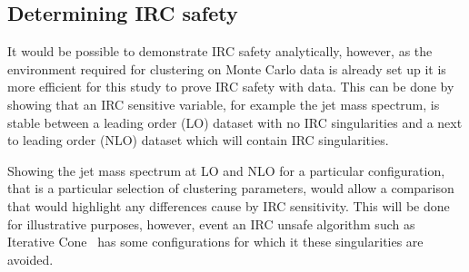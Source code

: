 
\subsection{Determining IRC safety}\label{sec:IRCmethod}
    It would be possible to demonstrate IRC safety analytically, however,
    as the environment required for clustering on Monte Carlo data is already set up
    it is more efficient for this study to prove IRC safety with data.
    This can be done by showing that an IRC sensitive variable, for example the jet mass spectrum,
    is stable between a leading order (LO) dataset with no IRC singularities and a next to leading order (NLO)
    dataset which will contain IRC singularities.

    Showing the jet mass spectrum at LO and NLO for a particular configuration,
    that is a particular selection of clustering parameters,
    would allow a comparison that would highlight any differences cause by IRC sensitivity.
    This will be done for illustrative purposes,
    however, event an IRC unsafe algorithm such as Iterative Cone~\cite{cacciari_antikt2018}
     has some configurations for which it these singularities are avoided.

